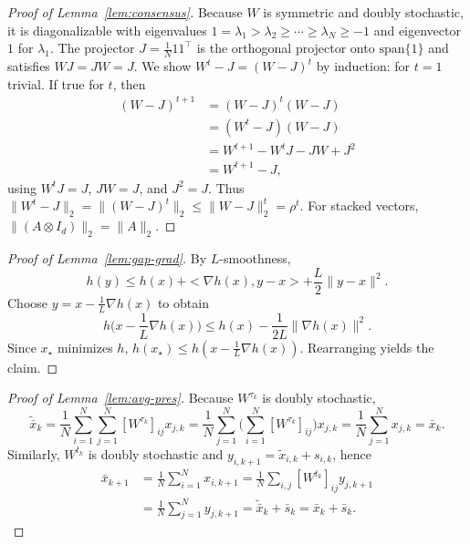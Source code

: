 \documentclass[11pt,a4paper]{article}
\def\one{1}%
\def\J{J}%
\def\ip#1#2{<#1,#2>}%
\newcommand{\one}{\mathbf{1}}
\newcommand{\ip}[2]{\left\langle #1,#2\right\rangle}
\newcommand{\J}{\left(\frac{1}{N}\one\one^\top\right)}
\begin{document}
\begin{proof}[Proof of Lemma~\ref{lem:consensus}]
Because $W$ is symmetric and doubly stochastic, it is diagonalizable with eigenvalues
$1=\lambda_1>\lambda_2\ge\cdots\ge\lambda_N\ge -1$ and eigenvector $\one$ for $\lambda_1$.
The projector $\J=\frac1N\one\one^\top$ is the orthogonal projector onto $\mathrm{span}\{\one\}$ and satisfies $W\J=\J W=\J$.
We show $W^t-\J=(W-\J)^t$ by induction: for $t=1$ trivial. If true for $t$, then
\begin{align*}
(W\!-\!\J)^{t+1}&=(W\!-\!\J)^t(W\!-\!\J)\\
&=(W^t\!-\!\J)(W\!-\!\J)\\
&=W^{t+1}\!-\!W^t\J\!-\!\J W\!+\!\J^2\\
&=W^{t+1}\!-\!\J,
\end{align*}
using $W^t\J=\J$, $\J W=\J$, and $\J^2=\J$.
Thus $\|W^t-\J\|_2=\|(W-\J)^t\|_2\le \|W-\J\|_2^t=\rho^t$.
For stacked vectors, $\|(A\otimes I_d)\|_2=\|A\|_2$.
\end{proof}

\begin{proof}[Proof of Lemma~\ref{lem:gap-grad}]
By $L$-smoothness,
\[
h(y)\le h(x)+\ip{\nabla h(x)}{y-x}+\frac{L}{2}\|y-x\|^2.
\]
Choose $y=x-\frac1L\nabla h(x)$ to obtain
\[
h\Big(x-\frac1L\nabla h(x)\Big)\le h(x)-\frac{1}{2L}\|\nabla h(x)\|^2.
\]
Since $x_\star$ minimizes $h$, $h(x_\star)\le h(x-\frac1L\nabla h(x))$. Rearranging yields the claim.
\end{proof}

\begin{proof}[Proof of Lemma~\ref{lem:avg-pres}]
Because $W^{\tau_k}$ is doubly stochastic,
\[
\tilde{\bar x}_k=\frac1N\sum_{i=1}^N\sum_{j=1}^N [W^{\tau_k}]_{ij}x_{j,k}
=\frac1N\sum_{j=1}^N\Big(\sum_{i=1}^N [W^{\tau_k}]_{ij}\Big)x_{j,k}
=\frac1N\sum_{j=1}^N x_{j,k}=\bar x_k.
\]
Similarly, $W^{t_k}$ is doubly stochastic and $y_{i,k+1}=\tilde x_{i,k}+s_{i,k}$, hence
\begin{align*}
\bar x_{k+1}
&=\tfrac1N\textstyle\sum_{i=1}^N x_{i,k+1}
=\tfrac1N\textstyle\sum_{i,j} [W^{t_k}]_{ij}y_{j,k+1}\\
&=\tfrac1N\textstyle\sum_{j=1}^N y_{j,k+1}
=\tilde{\bar x}_k+\bar s_k=\bar x_k+\bar s_k.
\end{align*}
\end{proof}
\end{document}
